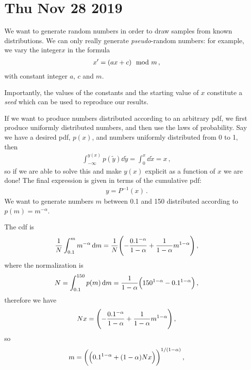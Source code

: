 \documentclass[main.tex]{subfiles}
\begin{document}
\section*{Thu Nov 28 2019}

We want to generate random numbers in order to draw samples from known distributions. 
We can only really generate \emph{pseudo}-random numbers: for example, we vary the integer\(x\) in the formula 
%
\begin{align}
  x' = \qty(ax+c) \mod m
\,,
\end{align}
%
with constant integer \(a\), \(c\) and \(m\). 

Importantly, the values of the constants and the starting value of \(x\) constitute a \emph{seed} which can be used to reproduce our results. 

If we want to produce numbers distributed according to an arbitrary pdf, we first produce uniformly distributed numbers, and then use the laws of probability. 
Say we have a desired pdf, \(p(x)\), and numbers uniformly distributed from 0 to 1, then 
%
\begin{align}
  \int_{ - \infty }^{y(x)} p(\widetilde{y}) \dd{\widetilde{y}} = \int_{0}^{x} \dd{\widetilde{x}} = x 
\,,
\end{align}
%
so if we are able to solve this and make \(y(x)\) explicit as a function of \(x\) we are done! The final expression is given in terms of the cumulative pdf: 
%
\begin{align}
  y = P^{-1} (x)
\,.
\end{align}
%
We want to generate numbers \(m\) between 0.1 and 150 distributed according to \(p(m) = m^{-\alpha }\). 

The cdf is 
%
\begin{align}
\frac{1}{N}\int_{0.1}^{m} m^{-\alpha } \dd{m} = \frac{1}{N}\qty(-\frac{0.1^{-\alpha }}{1-\alpha } +  \frac{1}{1-\alpha } m^{1-\alpha }  )
\,,
\end{align}
%
where the normalization is 
%
\begin{align}
  N = \int_{0.1}^{150} p(m) \dd{m} = \frac{1}{1-\alpha } \qty(150^{1-\alpha } - 0.1^{1-\alpha })
\,,
\end{align}
%
therefore we have 
%
\begin{align}
  Nx = \qty(-\frac{0.1^{-\alpha }}{1-\alpha } +  \frac{1}{1-\alpha } m^{1-\alpha }  )
\,,
\end{align}
%
so 
%
\begin{align}
  m = \qty(\qty(0.1^{1-\alpha } +  (1-\alpha ) Nx))^{1/(1-\alpha )}
\,,
\end{align}
%
\end{document}
